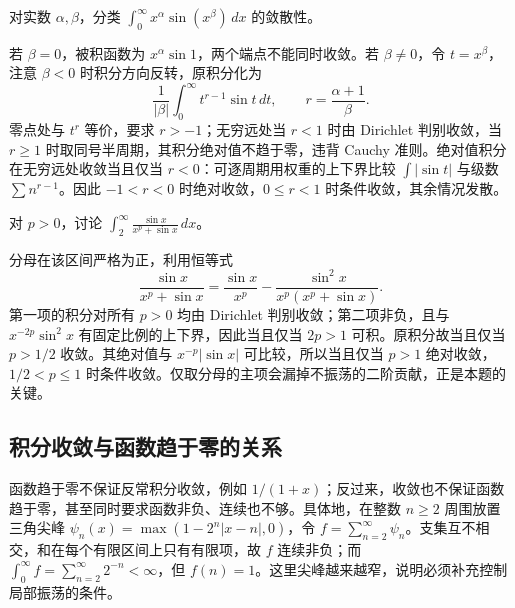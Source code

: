 \begin{example}
\label{ex:pei-int-oscillatory-power}
对实数 $\alpha,\beta$，分类 $\displaystyle\int_0^\infty x^\alpha\sin(x^\beta)\,dx$ 的敛散性。
\end{example}
\begin{solve}
若 $\beta=0$，被积函数为 $x^\alpha\sin1$，两个端点不能同时收敛。若 $\beta\ne0$，令 $t=x^\beta$，注意 $\beta<0$ 时积分方向反转，原积分化为
\[
 \frac1{|\beta|}\int_0^\infty t^{r-1}\sin t\,dt,
 \qquad r=\frac{\alpha+1}{\beta}.
\]
零点处与 $t^r$ 等价，要求 $r>-1$；无穷远处当 $r<1$ 时由 Dirichlet 判别收敛，当 $r\ge1$ 时取同号半周期，其积分绝对值不趋于零，违背 Cauchy 准则。绝对值积分在无穷远处收敛当且仅当 $r<0$：可逐周期用权重的上下界比较 $\int|\sin t|$ 与级数 $\sum n^{r-1}$。因此 $-1<r<0$ 时绝对收敛，$0\le r<1$ 时条件收敛，其余情况发散。
\end{solve}

\begin{example}
对 $p>0$，讨论 $\displaystyle\int_2^\infty\frac{\sin x}{x^p+\sin x}\,dx$。
\end{example}
\begin{solve}
分母在该区间严格为正，利用恒等式
\[
 \frac{\sin x}{x^p+\sin x}
 =\frac{\sin x}{x^p}-\frac{\sin^2x}{x^p(x^p+\sin x)}.
\]
第一项的积分对所有 $p>0$ 均由 Dirichlet 判别收敛；第二项非负，且与 $x^{-2p}\sin^2x$ 有固定比例的上下界，因此当且仅当 $2p>1$ 可积。原积分故当且仅当 $p>1/2$ 收敛。其绝对值与 $x^{-p}|\sin x|$ 可比较，所以当且仅当 $p>1$ 绝对收敛，$1/2<p\le1$ 时条件收敛。仅取分母的主项会漏掉不振荡的二阶贡献，正是本题的关键。
\end{solve}

\subsection{积分收敛与函数趋于零的关系}
函数趋于零不保证反常积分收敛，例如 $1/(1+x)$；反过来，收敛也不保证函数趋于零，甚至同时要求函数非负、连续也不够。具体地，在整数 $n\ge2$ 周围放置三角尖峰 $\psi_n(x)=\max(1-2^n|x-n|,0)$，令 $f=\sum_{n=2}^\infty\psi_n$。支集互不相交，和在每个有限区间上只有有限项，故 $f$ 连续非负；而 $\int_0^\infty f=\sum_{n=2}^\infty2^{-n}<\infty$，但 $f(n)=1$。这里尖峰越来越窄，说明必须补充控制局部振荡的条件。

